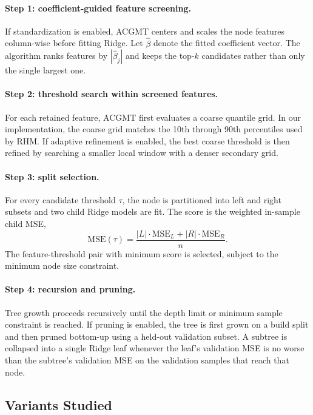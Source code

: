 \documentclass[11pt,a4paper]{article}
\begin{document}
\paragraph{Step 1: coefficient-guided feature screening.}
If standardization is enabled, ACGMT centers and scales the node features column-wise before fitting Ridge. Let $\hat{\beta}$ denote the fitted coefficient vector. The algorithm ranks features by $|\hat{\beta}_j|$ and keeps the top-$k$ candidates rather than only the single largest one.

\paragraph{Step 2: threshold search within screened features.}
For each retained feature, ACGMT first evaluates a coarse quantile grid. In our implementation, the coarse grid matches the 10th through 90th percentiles used by RHM. If adaptive refinement is enabled, the best coarse threshold is then refined by searching a smaller local window with a denser secondary grid.

\paragraph{Step 3: split selection.}
For every candidate threshold $\tau$, the node is partitioned into left and right subsets and two child Ridge models are fit. The score is the weighted in-sample child MSE,
\[
\mathrm{MSE}(\tau) =
\frac{|L| \cdot \mathrm{MSE}_L + |R| \cdot \mathrm{MSE}_R}{n}.
\]
The feature-threshold pair with minimum score is selected, subject to the minimum node size constraint.

\paragraph{Step 4: recursion and pruning.}
Tree growth proceeds recursively until the depth limit or minimum sample constraint is reached. If pruning is enabled, the tree is first grown on a build split and then pruned bottom-up using a held-out validation subset. A subtree is collapsed into a single Ridge leaf whenever the leaf's validation MSE is no worse than the subtree's validation MSE on the validation samples that reach that node.

\subsection{Variants Studied}
\end{document}
